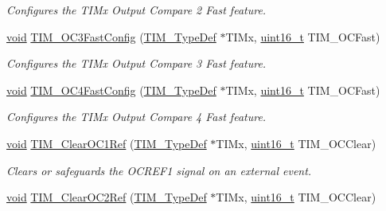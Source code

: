 \begin{DoxyCompactItemize}
\begin{DoxyCompactList}\small\item\em Configures the T\+I\+Mx Output Compare 2 Fast feature. \end{DoxyCompactList}\item 
\hyperlink{usb__devapi_8h_afabf60e7f57651d6d595a02c75f07cd0}{void} \hyperlink{group___t_i_m___exported___functions_gab2f3698e6e56bd9b0a4be7056ba789e1}{T\+I\+M\+\_\+\+O\+C3\+Fast\+Config} (\hyperlink{struct_t_i_m___type_def}{T\+I\+M\+\_\+\+Type\+Def} $\ast$T\+I\+Mx, \hyperlink{_p_e___types_8h_a1f1825b69244eb3ad2c7165ddc99c956}{uint16\+\_\+t} T\+I\+M\+\_\+\+O\+C\+Fast)
\begin{DoxyCompactList}\small\item\em Configures the T\+I\+Mx Output Compare 3 Fast feature. \end{DoxyCompactList}\item 
\hyperlink{usb__devapi_8h_afabf60e7f57651d6d595a02c75f07cd0}{void} \hyperlink{group___t_i_m___exported___functions_ga58279a04e8ea5333f1079d3cce8dde12}{T\+I\+M\+\_\+\+O\+C4\+Fast\+Config} (\hyperlink{struct_t_i_m___type_def}{T\+I\+M\+\_\+\+Type\+Def} $\ast$T\+I\+Mx, \hyperlink{_p_e___types_8h_a1f1825b69244eb3ad2c7165ddc99c956}{uint16\+\_\+t} T\+I\+M\+\_\+\+O\+C\+Fast)
\begin{DoxyCompactList}\small\item\em Configures the T\+I\+Mx Output Compare 4 Fast feature. \end{DoxyCompactList}\item 
\hyperlink{usb__devapi_8h_afabf60e7f57651d6d595a02c75f07cd0}{void} \hyperlink{group___t_i_m___exported___functions_ga34e926cd8a99cfcc7480b2d6de5118b6}{T\+I\+M\+\_\+\+Clear\+O\+C1\+Ref} (\hyperlink{struct_t_i_m___type_def}{T\+I\+M\+\_\+\+Type\+Def} $\ast$T\+I\+Mx, \hyperlink{_p_e___types_8h_a1f1825b69244eb3ad2c7165ddc99c956}{uint16\+\_\+t} T\+I\+M\+\_\+\+O\+C\+Clear)
\begin{DoxyCompactList}\small\item\em Clears or safeguards the O\+C\+R\+E\+F1 signal on an external event. \end{DoxyCompactList}\item 
\hyperlink{usb__devapi_8h_afabf60e7f57651d6d595a02c75f07cd0}{void} \hyperlink{group___t_i_m___exported___functions_gac474ebc815d24c8a589969e0c68b27b0}{T\+I\+M\+\_\+\+Clear\+O\+C2\+Ref} (\hyperlink{struct_t_i_m___type_def}{T\+I\+M\+\_\+\+Type\+Def} $\ast$T\+I\+Mx, \hyperlink{_p_e___types_8h_a1f1825b69244eb3ad2c7165ddc99c956}{uint16\+\_\+t} T\+I\+M\+\_\+\+O\+C\+Clear)

\end{DoxyCompactItemize}
